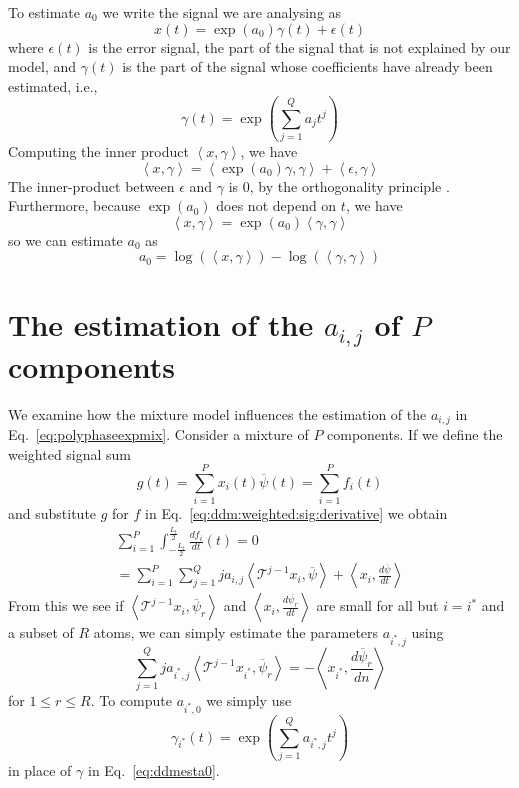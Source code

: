 \documentclass[twoside,a4paper]{article}
\begin{document}
To estimate $a_0$ we write the signal we are analysing as
\[
    x(t) = \exp(a_0) \gamma(t) + \epsilon (t)
\]
where $\epsilon (t)$ is the error signal, the part of the signal that is not explained
by our model, and $\gamma (t)$ is the part of the signal
whose coefficients have already been estimated, i.e.,
\[
    \gamma(t) = \exp \left( \sum_{j=1}^{Q} a_j t^{j} \right)
\]
Computing the inner product $\left\langle x , \gamma \right\rangle$, we have
\[
    \left\langle x , \gamma \right\rangle
    =
    \left\langle \exp(a_0) \gamma , \gamma \right\rangle + 
        \left\langle \epsilon , \gamma \right\rangle
\]
The inner-product between $\epsilon$ and $\gamma$ is $0$, by the orthogonality
principle \cite[ch.~12]{kay1993fundamentals}. Furthermore, because $\exp(a_0)$ does not
depend on $t$, we have
\[
    \left\langle x , \gamma \right\rangle
    =
    \exp(a_0) \left\langle \gamma , \gamma \right\rangle
\]
so we can estimate $a_0$ as
\begin{equation}
    \label{eq:ddmesta0}
    a_0 = \log \left( \left\langle x , \gamma \right\rangle \right)
        - \log \left( \left\langle \gamma , \gamma \right\rangle \right)
\end{equation}

\section{The estimation of the $a_{i,j}$ of $P$ components}

We examine how the mixture model influences the estimation of the $a_{i,j}$ in
Eq.~\ref{eq:polyphaseexpmix}.
Consider a mixture of $P$ components.
If we define the weighted signal sum
%
\[
    g(t) = \sum_{i=1}^{P} x_{i}(t) \overline{\psi}(t) = \sum_{i=1}^{P} f_{i}(t)
\]
%
and substitute $g$ for $f$ in Eq.~\ref{eq:ddm:weighted:sig:derivative} we obtain
%
\begin{multline}
    \label{eq:mixest}
    \sum_{i=1}^{P} \int_{-\frac{L_{t}}{2}}^{\frac{L_{t}}{2}} \frac{df_{i}}{dt}(t) =
    0
    \\ = 
    \sum_{i=1}^{P}
    \sum_{j=1}^{Q} j a_{i,j} 
    \left\langle \mathcal{T}^{j-1} x_i , \overline{\psi} \right\rangle
     + \left\langle x_i, \frac{d\overline{\psi}}{dt} \right\rangle
\end{multline}
%
From this we see if $\left\langle \mathcal{T}^{j-1} x_i , \overline{\psi}_{r}
\right\rangle$ and $\left\langle x_i, \frac{d\overline{\psi_{r}}}{dt} \right\rangle$
are small for all but $i = i^{\ast}$ and a subset of $R$ atoms, we
can simply estimate the parameters $a_{i^{\ast},j}$ using
\[
    \sum_{j=1}^{Q} j a_{{i^{\ast}},j} 
    \left\langle \mathcal{T}^{j-1} x_{i^{\ast}} , \overline{\psi}_{r} \right\rangle
    = -\left\langle x_{i^{\ast}}, \frac{d\overline{\psi}_{r}}{dn} \right\rangle
\]
for $1 \leq r \leq R$. To compute $a_{i^{\ast},0}$ we simply use
\[
    \gamma_{i^{\ast}}(t) = \exp \left( \sum_{j=1}^{Q} a_{i^{\ast},j} t^{j} \right)
\]
in place of $\gamma$ in Eq.~\ref{eq:ddmesta0}.
\end{document}
